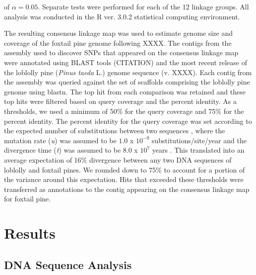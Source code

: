 \documentclass[11pt]{article}
\begin{document}
of $\alpha = 0.05$. Separate tests were performed for each of the 12 linkage groups. All analysis was conducted in the R ver. 3.0.2 statistical
computing environment.

The resulting consensus linkage map was used to estimate genome size and coverage of the foxtail pine genome following XXXX. The contigs 
from the assembly used to discover SNPs that appeared on the consensus linkage map were annotated using BLAST tools (CITATION) 
and the most recent release of the loblolly pine (\textit{Pinus taeda} L.) genome sequence (v. XXXX). Each contig from the assembly was queried against 
the set of scaffolds comprising the loblolly pine genome using blastn. The top hit from each comparison was retained and these top
hits were filtered based on query coverage and the percent identity. As a thresholds, we used a minimum of 50\% for the query
coverage and 75\% for the percent identity. The percent identity for the query coverage was set according to the expected number
of substitutions between two sequences \citep[2\textit{ut}, see][]{Nei:1987}, where the mutation rate (\textit{u}) was assumed to be 
$1.0$ x $10^{-9}$ substitutions/site/year and the divergence time (\textit{t}) was assumed to be $8.0$ x $10^{7}$ years \citep{Willyard:2007}. 
This translated into an average expectation of 16\% divergence between any two DNA sequences of loblolly and foxtail pines. We rounded down to 
75\% to account for a portion of the variance around this expectation. Hits that exceeded these thresholds were transferred as annotations to the contig 
appearing on the consensus linkage map for foxtail pine. 

\section*{Results}

\subsection*{DNA Sequence Analysis}
\end{document}
